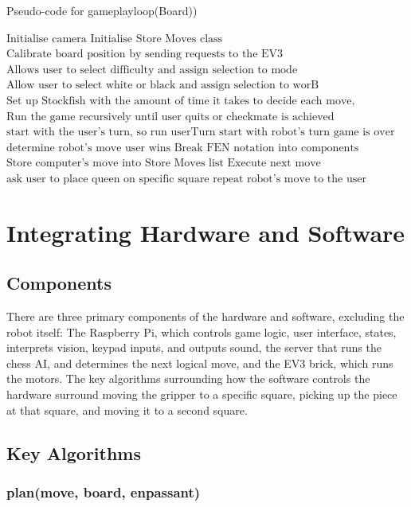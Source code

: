 \documentclass[onecolumn]{IEEEtran}
\begin{document}
\begin{algorithm}[H]
\caption{Pseudo-code for gameplayloop(Board))}
\begin{algorithmic}[1]
\STATE $\text{Initialise camera}$
\STATE $\text{Initialise Store Moves class}$
\STATE $\text{Calibrate board position by sending requests to the EV3}$
\STATE $\text{Allows user to select difficulty and assign selection to mode}$
\STATE $\text{Allow user to select white or black and assign selection to worB}$
\STATE $\text{Set up Stockfish with the amount of time it takes to decide each move, determined by the difficulty level}$
\STATE $\text{Run the game recursively until user quits or checkmate is achieved}$
\STATE $\text{start with the user's turn, so run userTurn}$
\ELSE
\STATE $\text{start with robot's turn}$
\ENDIF
{}
\STATE $\text{game is over}$
\ELSE
\STATE $\text{determine robot's move}$
	\STATE $\text{user wins}$
	\ELSE
	\STATE $\text{Break FEN notation into components}$
	\STATE $\text{Store computer's move into Store Moves list}$
	\STATE $\text{Execute next move}$
		\STATE $\text{ask user to place queen on specific square}$
		\ENDIF
	\STATE $\text{repeat robot's move to the user}$
	\ENDIF
\ENDIF
\end{algorithmic}
\end{algorithm}


\section{Integrating Hardware and Software}
\subsection{Components}
There are three primary components of the hardware and software, excluding the robot itself: The Raspberry Pi, which controls game logic, user interface, states, interprets vision, keypad inputs, and outputs sound, the server that runs the chess AI, and determines the next logical move, and the EV3 brick, which runs the motors. The key algorithms surrounding how the software controls the hardware surround moving the gripper to a specific square, picking up the piece at that square, and moving it to a second square. 
\subsection{Key Algorithms}


\subsubsection{plan(move, board, enpassant)}
\end{document}
